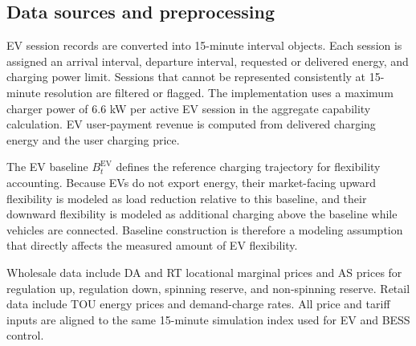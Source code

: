 \documentclass[final,5p,times]{elsarticle}
\newcommand{\EV}{\mathrm{EV}}
\begin{document}
\subsection{Data sources and preprocessing}
EV session records are converted into 15-minute interval objects. Each session is assigned an arrival interval, departure interval, requested or delivered energy, and charging power limit. Sessions that cannot be represented consistently at 15-minute resolution are filtered or flagged. The implementation uses a maximum charger power of 6.6 kW per active EV session in the aggregate capability calculation. EV user-payment revenue is computed from delivered charging energy and the user charging price.

The EV baseline $B_t^{\EV}$ defines the reference charging trajectory for flexibility accounting. Because EVs do not export energy, their market-facing upward flexibility is modeled as load reduction relative to this baseline, and their downward flexibility is modeled as additional charging above the baseline while vehicles are connected. Baseline construction is therefore a modeling assumption that directly affects the measured amount of EV flexibility.

Wholesale data include DA and RT locational marginal prices and AS prices for regulation up, regulation down, spinning reserve, and non-spinning reserve. Retail data include TOU energy prices and demand-charge rates. All price and tariff inputs are aligned to the same 15-minute simulation index used for EV and BESS control.
\end{document}
